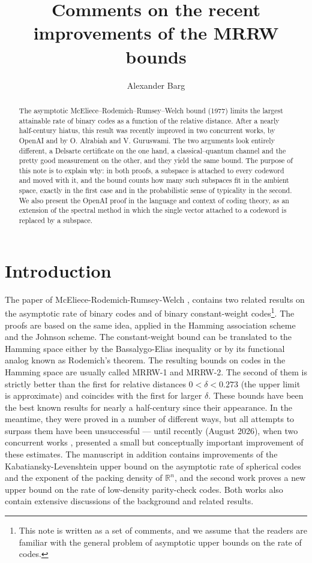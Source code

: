\documentclass[11pt]{amsart}
\title[Improvements of the MRRW bounds]{Comments on the recent improvements of the MRRW bounds}
\author{Alexander Barg}\address{University of Maryland}\email{abarg@umd.edu}
\date{}
\theoremstyle{plain}
\theoremstyle{remark}
\newcommand{\R}{\mathbb{R}}
\begin{document}
\begin{abstract} The asymptotic McEliece–Rodemich–Rumsey–Welch bound (1977) limits the largest attainable rate of binary codes as a function of the relative distance. After a nearly half-century hiatus, this result was recently improved in two concurrent works, by OpenAI and by O. Alrabiah and V. Guruswami. The two arguments look entirely different, a Delsarte certificate on the one hand, a classical–quantum channel and the pretty good measurement on the other, and they yield the same bound. The purpose of this note is to explain why: in both proofs, a subspace is attached to every codeword and moved with it, and the bound counts how many such subspaces fit in the ambient space, exactly in the first case and in the probabilistic sense of typicality in the second. We also present the OpenAI proof in the language and context of coding theory, as an extension of the spectral method in which the single vector attached to a codeword is replaced by a subspace.\end{abstract}

\maketitle

{\small{\tableofcontents}}

\section{Introduction}
The paper of McEliece-Rodemich-Rumsey-Welch \cite{MRRW77}, contains two related results on the asymptotic rate of binary codes and of binary constant-weight codes\footnote{This note is written as a set of comments, and we assume that the readers are familiar with the general problem of asymptotic upper bounds on the rate of codes.}. The proofs are based on the same idea, applied in the Hamming association scheme and the Johnson scheme. The constant-weight bound can be translated to the Hamming space either by the Bassalygo-Elias inequality or by its functional analog known as Rodemich's theorem. The resulting bounds on codes in the Hamming space are usually called MRRW-1 and MRRW-2. The second of them is strictly better than the first for relative distances $0<\delta< 0.273$ (the upper limit is approximate) and coincides with the first for larger $\delta$. These bounds have been the best known results for nearly a half-century since their appearance. In the meantime, they were proved in a number of different ways, but all attempts to surpass them have been unsuccessful --- until recently (August 2026), when two concurrent works \cite{OAI26}, \cite{AG26} presented a small but conceptually important improvement of these estimates. The manuscript \cite{OAI26} in addition contains improvements of the Kabatiansky-Levenshtein upper bound on the asymptotic rate of spherical codes and the exponent of the packing density of $\R^n$, and the second work \cite{AG26} proves a new upper bound on the rate of low-density parity-check codes. Both works also contain extensive discussions of the background and related results. 
\end{document}
